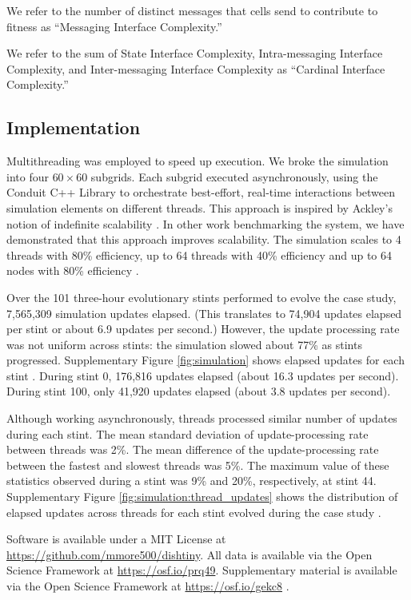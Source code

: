 We refer to the number of distinct messages that cells send to contribute to fitness as ``Messaging Interface Complexity.''

We refer to the sum of State Interface Complexity, Intra-messaging Interface Complexity, and Inter-messaging Interface Complexity as ``Cardinal Interface Complexity.''

\subsection{Implementation}

Multithreading was employed to speed up execution.
We broke the simulation into four $60\times60$ subgrids.
Each subgrid executed asynchronously, using the Conduit C++ Library to orchestrate best-effort, real-time interactions between simulation elements on different threads.
This approach is inspired by Ackley's notion of indefinite scalability \citep{ackley2014indefinitely}.
In other work benchmarking the system, we have demonstrated that this approach improves scalability.
The simulation scales to 4 threads with 80\% efficiency, up to 64 threads with 40\% efficiency and up to 64 nodes with 80\% efficiency \citep{moreno2021conduit}.

Over the 101 three-hour evolutionary stints performed to evolve the case study, 7,565,309 simulation updates elapsed.
(This translates to 74,904 updates elapsed per stint or about 6.9 updates per second.)
However, the update processing rate was not uniform across stints: the simulation slowed about 77\% as stints progressed.
Supplementary Figure \ref{fig:simulation} shows elapsed updates for each stint \citep{Moreno_2021}.
During stint 0, 176,816 updates elapsed (about 16.3 updates per second).
During stint 100, only 41,920 updates elapsed (about 3.8 updates per second).

Although working asynchronously, threads processed similar number of updates during each stint.
The mean standard deviation of update-processing rate between threads was 2\%.
The mean difference of the update-processing rate between the fastest and slowest threads was 5\%.
The maximum value of these statistics observed during a stint was 9\% and 20\%, respectively, at stint 44.
Supplementary Figure \ref{fig:simulation:thread_updates} shows the distribution of elapsed updates across threads for each stint evolved during the case study \citep{Moreno_2021}.

Software is available under a MIT License at \url{https://github.com/mmore500/dishtiny}.
All data is available via the Open Science Framework at \url{https://osf.io/prq49}.
Supplementary material is available via the Open Science Framework at \url{https://osf.io/gekc8} \citep{Moreno_2021}.
